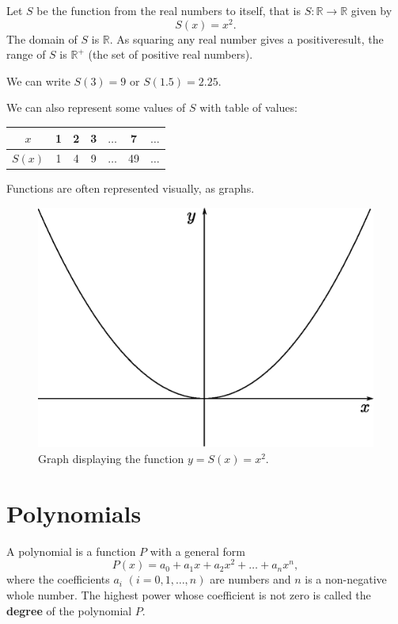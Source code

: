 \begin{example}
Let $S$ be the function from the real numbers to itself, that is $S:\mathbb{R}\rightarrow \mathbb{R}$ given by
\begin{equation}
S(x)=x^2.
\end{equation}
The domain of $S$ is $\mathbb{R}$. As squaring any real number gives a positiveresult, the range of $S$ is $\mathbb{R}^+$ (the set of positive real numbers).

We can write $S(3)=9$ or $S(1.5)=2.25$.

We can also represent some values of $S$ with table of values:
\begin{center}
    \begin{tabular}{ | c | c | c | c | c | c | c |}
    \hline
    $x$  & 1 & 2 & 3 & $\dots$ & 7 & $\dots$  \\ \hline
    $S(x)$ & 1 & 4 & 9 & $\dots$ & 49 & $\dots$  \\ \hline
    \end{tabular}
\end{center}

Functions are often represented visually, as graphs.

\begin{figure}[H]
\centering
\includegraphics[scale=0.65]{img/x-squared-graph}
\captionstyle{\centering\it}
\caption{Graph displaying the function $y=S(x)=x^2$.}
\label{fig:x-squared-graph}
\end{figure}
\end{example}

\section{Polynomials}
\begin{definition}
A polynomial is a function $P$ with a general form
\begin{equation}
P(x)=a_0 + a_1x + a_2x^2+\dots+a_nx^n,
\end{equation}
where the coefficients $a_i$ $(i=0,1,\dots,n)$ are numbers and $n$ is a non-negative whole number. The highest power whose coefficient is not zero is called the \textbf{degree} of the polynomial $P$.
\end{definition}

